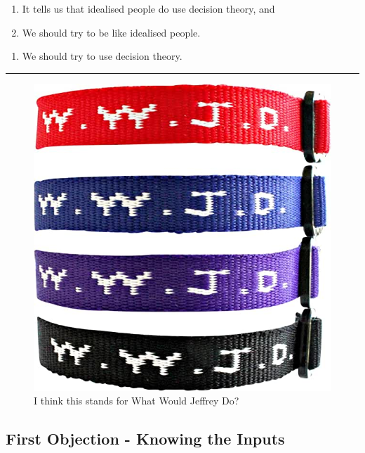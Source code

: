 \documentclass[
  letterpaper,
  DIV=11,
  numbers=noendperiod]{scrartcl}
\providecommand{\tightlist}{%
  \setlength{\itemsep}{0pt}\setlength{\parskip}{0pt}}\usepackage{longtable,booktabs,array}
\begin{document}
\begin{enumerate}
\def\labelenumi{\arabic{enumi}.}
\tightlist
\item
  It tells us that idealised people do use decision theory, and
\item
  We should try to be like idealised people.
\end{enumerate}

\begin{enumerate}
\def\labelenumi{\Alph{enumi}.}
\setcounter{enumi}{2}
\tightlist
\item
  We should try to use decision theory.
\end{enumerate}

\begin{center}\rule{0.5\linewidth}{0.5pt}\end{center}

\begin{figure}[H]

{\centering \includegraphics{bracelet.jpg}

}

\caption{I think this stands for What Would Jeffrey Do?}

\end{figure}%

\subsection{First Objection - Knowing the
Inputs}\label{first-objection---knowing-the-inputs}
\end{document}
